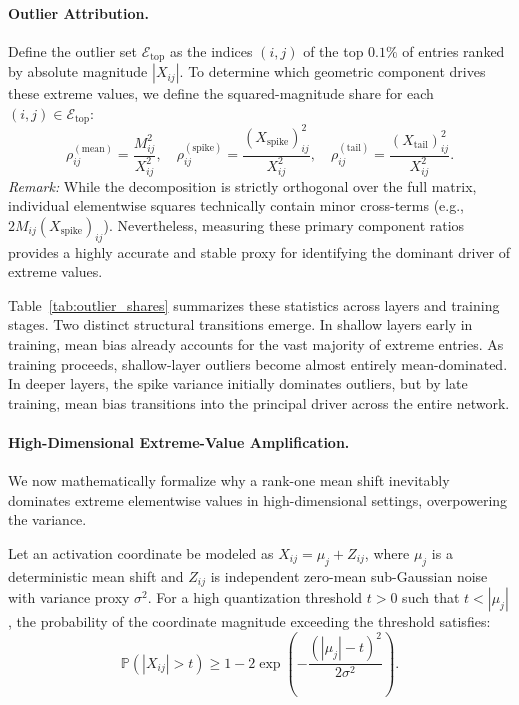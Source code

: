 \paragraph{Outlier Attribution.} 
Define the outlier set $\mathcal{E}_{\text{top}}$ as the indices $(i,j)$ of the top $0.1\%$ of entries ranked by absolute magnitude $|X_{ij}|$. To determine which geometric component drives these extreme values, we define the squared-magnitude share for each $(i,j) \in \mathcal{E}_{\text{top}}$:
\begin{equation}
\rho_{ij}^{(\text{mean})} = \frac{M_{ij}^2}{X_{ij}^2}, \quad \rho_{ij}^{(\text{spike})} = \frac{(X_{\text{spike}})_{ij}^2}{X_{ij}^2}, \quad \rho_{ij}^{(\text{tail})} = \frac{(X_{\text{tail}})_{ij}^2}{X_{ij}^2}.
\end{equation}
\textit{Remark:} While the decomposition is strictly orthogonal over the full matrix, individual elementwise squares technically contain minor cross-terms (e.g., $2M_{ij}(X_{\text{spike}})_{ij}$). Nevertheless, measuring these primary component ratios provides a highly accurate and stable proxy for identifying the dominant driver of extreme values.

Table~\ref{tab:outlier_shares} summarizes these statistics across layers and training stages. Two distinct structural transitions emerge. In shallow layers early in training, mean bias already accounts for the vast majority of extreme entries. As training proceeds, shallow-layer outliers become almost entirely mean-dominated. In deeper layers, the spike variance initially dominates outliers, but by late training, mean bias transitions into the principal driver across the entire network.

\paragraph{High-Dimensional Extreme-Value Amplification.} 
We now mathematically formalize why a rank-one mean shift inevitably dominates extreme elementwise values in high-dimensional settings, overpowering the variance.

\begin{theorem}
\label{thm:extreme_dominance}
Let an activation coordinate be modeled as $X_{ij} = \mu_j + Z_{ij}$, where $\mu_j$ is a deterministic mean shift and $Z_{ij}$ is independent zero-mean sub-Gaussian noise with variance proxy $\sigma^2$. For a high quantization threshold $t > 0$ such that $t < |\mu_j|$, the probability of the coordinate magnitude exceeding the threshold satisfies:
\begin{equation}
\mathbb{P}(|X_{ij}| > t) \ge 1 - 2\exp\left(-\frac{(|\mu_j| - t)^2}{2\sigma^2}\right).
\end{equation}
\end{theorem}

